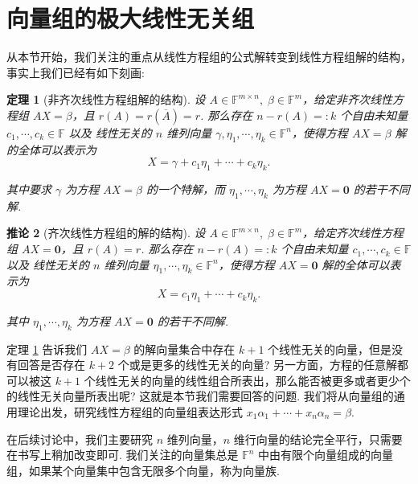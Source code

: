 \documentclass[10pt,openany]{article}
\theoremstyle{thmstyle} %
\newtheorem{theorem}{定理}[subsection]
\theoremstyle{defstyle} %
\newtheorem{corollary}[theorem]{推论}
\theoremstyle{prostyle} %
\theoremstyle{exastyle}
\theoremstyle{remstyle}
\newcommand{\F}{\mathbb{F}}
\newcommand{\mn}{^{m \times n}}
\begin{document}
\pagestyle{fancy}
\rhead{\today}

\setcounter{section}{4}

\section{向量组的极大线性无关组}

从本节开始，我们关注的重点从线性方程组的公式解转变到线性方程组解的结构，事实上我们已经有如下刻画:

\begin{theorem}[非齐次线性方程组解的结构] \label{5.0.1}
	设 \( A \in \F\mn, \; \beta \in \F^m \)，给定非齐次线性方程组 \( AX=\beta \)，且 \( r(A)=r(\overline{A})=r \). 那么存在 \( n-r(A)=:k \) 个自由未知量 \( c_1,\cdots,c_{k} \in \F \) 以及{\color{blue} 线性无关的} \( n \) 维列向量 \( \gamma,\eta_1,\cdots,\eta_k \in \F^n \)，使得方程 \( AX=\beta \) 解的全体可以表示为
	\[ X=\gamma+c_1\eta_1+\cdots+c_k\eta_k. \] 
	
	其中要求 \( \gamma \) 为方程 \( AX=\beta \) 的一个特解，而 \( \eta_1,\cdots,\eta_k \) 为方程 \( AX=\bm{0} \) 的若干不同解.
\end{theorem}


\begin{corollary}[齐次线性方程组的解的结构] \label{5.0.2}
	设 \( A \in \F\mn, \; \beta \in \F^m \)，给定齐次线性方程组 \( AX=\bm{0} \)，且 \( r(A)=r \). 那么存在 \( n-r(A)=:k \) 个自由未知量 \( c_1,\cdots,c_{k} \in \F \) 以及{\color{blue} 线性无关的} \( n \) 维列向量 \( \eta_1,\cdots,\eta_k \in \F^n \)，使得方程 \( AX=\bm{0} \) 解的全体可以表示为
	\[ X=c_1\eta_1+\cdots+c_k\eta_k. \] 
	
	其中 \( \eta_1,\cdots,\eta_k \) 为方程 \( AX=\bm{0} \) 的若干不同解.
\end{corollary}

定理 \ref{5.0.1} 告诉我们 \( AX=\beta \) 的解向量集合中存在 \( k+1 \) 个线性无关的向量，但是没有回答是否存在 \( k+2 \) 个或是更多的线性无关的向量? 另一方面，方程的任意解都可以被这 \( k+1 \) 个线性无关的向量的线性组合所表出，那么能否被更多或者更少个的线性无关向量所表出呢? 这就是本节我们需要回答的问题. 我们将从向量组的通用理论出发，研究线性方程组的向量组表达形式 \( x_1\alpha_1+\cdots+x_n\alpha_n=\beta \).

在后续讨论中，我们主要研究 \( n \) 维列向量，\( n \) 维行向量的结论完全平行，只需要在书写上稍加改变即可. 我们关注的向量集总是 \( \F^n \) 中由有限个向量组成的向量组，如果某个向量集中包含无限多个向量，称为向量族.
\end{document}
